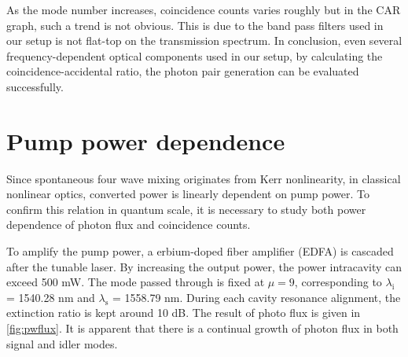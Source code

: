 As the mode number increases, coincidence counts varies roughly but in the CAR graph, such a trend is not obvious. This is due to the band pass filters used in our setup is not flat-top on the transmission spectrum. In conclusion, even several frequency-dependent optical components used in our setup, by calculating the coincidence-accidental ratio, the photon pair generation can be evaluated successfully.

\begin{figure}
	\centering
	
	\label{fig:mode_cf}
\end{figure}

\section{Pump power dependence}

Since spontaneous four wave mixing originates from Kerr nonlinearity, in classical nonlinear optics, converted power is linearly dependent on pump power. To confirm this relation in quantum scale, it is necessary to study both power dependence of photon flux and coincidence counts.

To amplify the pump power, a erbium-doped fiber amplifier (EDFA) is cascaded after the tunable laser. By increasing the output power, the power intracavity can exceed 500 mW. 
The mode passed through is fixed at $ \mu=9 $, corresponding to $\lambda_\mathrm{i}$ = 1540.28 nm and $\lambda_\mathrm{s}$ = 1558.79 nm. During each cavity resonance alignment, the extinction ratio is kept around 10 dB. 
The result of photo flux is given in \autoref{fig:pwflux}. It is apparent that there is a continual growth of photon flux in both signal and idler modes. 

\begin{figure}
	\centering
	
	\label{fig:pwflux}
\end{figure}

\begin{figure}
	\centering
	
	\label{fig:pwcar}
\end{figure}

